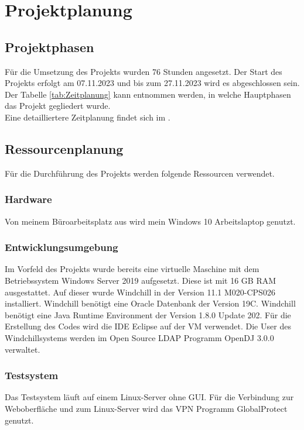 \section{Projektplanung} 
\label{sec:Projektplanung}


\subsection{Projektphasen}
\label{sec:Projektphasen}

Für die Umsetzung des Projekts wurden 76 Stunden angesetzt.
Der Start des Projekts erfolgt am 07.11.2023 und bis zum 27.11.2023 wird es abgeschlossen sein.
Der Tabelle \ref{tab:Zeitplanung} kann entnommen werden, in welche Hauptphasen das Projekt gegliedert wurde.
\\
Eine detailliertere Zeitplanung findet sich im .


\subsection{Ressourcenplanung}
\label{sec:Ressourcenplanung}

Für die Durchführung des Projekts werden folgende Ressourcen verwendet.

\subsubsection{Hardware}
Von meinem Büroarbeitsplatz aus wird mein Windows 10 Arbeitslaptop genutzt.

\subsubsection{Entwicklungsumgebung}
Im Vorfeld des Projekts wurde bereits eine virtuelle Maschine mit dem Betriebssystem Windows Server 2019 aufgesetzt.
Diese ist mit 16 GB RAM ausgestattet.
Auf dieser wurde Windchill in der Version 11.1 M020-CPS026 installiert.
Windchill benötigt eine Oracle Datenbank der Version 19C.
Windchill benötigt eine Java Runtime Environment der Version 1.8.0 Update 202.
Für die Erstellung des Codes wird die IDE Eclipse auf der \acs{VM} verwendet.
Die User des Windchillsystems werden im Open Source LDAP Programm OpenDJ 3.0.0 verwaltet.

\subsubsection{Testsystem}
Das Testsystem läuft auf einem Linux-Server ohne GUI.
Für die Verbindung zur Weboberfläche und zum Linux-Server wird das VPN Programm GlobalProtect genutzt.

